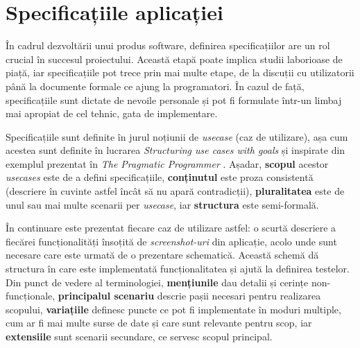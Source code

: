 \chapter{Specificațiile aplicației}\label{specs}

În cadrul dezvoltării unui produs software, definirea specificațiilor are un rol crucial în succesul proiectului. Această etapă poate implica studii laborioase de piață, iar specificațiile pot trece prin mai multe etape, de la discuții cu utilizatorii până la documente formale ce ajung la programatori. În cazul de față, specificațiile sunt dictate de nevoile personale și pot fi formulate într-un limbaj mai apropiat de cel tehnic, gata de implementare.

Specificațiile sunt definite în jurul noțiunii de \emph{usecase} (caz de utilizare), așa cum acestea sunt definite în lucrarea \emph{Structuring use cases with goals} \cite{cockburn1997structuring} și inspirate din exemplul prezentat în \emph{The Pragmatic Programmer} \cite{Hunt:2000:PPJ:320326}. Așadar, \textbf{scopul} acestor \emph{usecases} este de a defini specificațiile, \textbf{conținutul} este proza consistentă (descriere în cuvinte astfel încât să nu apară contradicții), \textbf{pluralitatea} este de unul sau mai multe scenarii per \emph{usecase}, iar \textbf{structura} este semi-formală.

În continuare este prezentat fiecare caz de utilizare astfel: o scurtă descriere a fiecărei funcționalități însoțită de \emph{screenshot-uri} din aplicație, acolo unde sunt necesare care este urmată de o prezentare schematică. Această schemă dă structura în care este implementată funcționalitatea și ajută la definirea testelor. Din punct de vedere al terminologiei, \textbf{mențiunile} dau detalii și cerințe non-funcționale, \textbf{principalul scenariu} descrie pașii necesari pentru realizarea scopului, \textbf{variațiile} definesc puncte ce pot fi implementate în moduri multiple, cum ar fi mai multe surse de date și care sunt relevante pentru scop, iar \textbf{extensiile} sunt scenarii secundare, ce servesc scopul principal.







